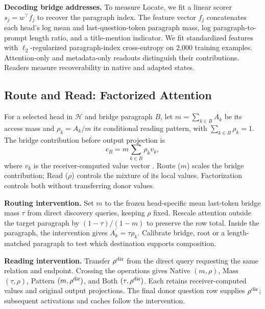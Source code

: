 \textbf{Decoding bridge addresses.} To measure Locate, we fit a linear scorer $s_j=w^\top f_j$ to recover the paragraph index. The feature vector $f_j$ concatenates each head's log mean and last-question-token paragraph mass, log paragraph-to-prompt length ratio, and a title-mention indicator. We fit standardized features with $\ell_2$-regularized paragraph-index cross-entropy on 2,000 training examples. Attention-only and metadata-only readouts distinguish their contributions. Readers measure recoverability in native and adapted states.
\subsection{Route and Read: Factorized Attention}\label{sec:factorization}
For a selected head in $\mathcal{H}$ and bridge paragraph $B$, let $m=\sum_{k\in B}A_k$ be its access mass and $\rho_k=A_k/m$ its conditional reading pattern, with $\sum_{k\in B}\rho_k=1$. The bridge contribution before output projection is
\begin{equation}c_B=m\sum_{k\in B}\rho_k v_k,\label{eq:contribution}\end{equation}
where $v_k$ is the receiver-computed value vector \citep{vaswani2017attention}. Route ($m$) scales the bridge contribution; Read ($\rho$) controls the mixture of its local values. Factorization controls both without transferring donor values.

\textbf{Routing intervention.} Set $m$ to the frozen head-specific mean last-token bridge mass $\tau$ from direct discovery queries, keeping $\rho$ fixed. Rescale attention outside the target paragraph by $(1-\tau)/(1-m)$ to preserve the row total. Inside the paragraph, the intervention gives $A_k^{\prime}=\tau\rho_k$. Calibrate bridge, root or a length-matched paragraph to test which destination supports composition.




\label{sec:reading}\textbf{Reading intervention.} Transfer $\rho^{\rm dir}$ from the direct query requesting the same relation and endpoint. Crossing the operations gives Native $(m,\rho)$, Mass $(\tau,\rho)$, Pattern $(m,\rho^{\rm dir})$, and Both $(\tau,\rho^{\rm dir})$. Each retains receiver-computed values and original output projections. The final donor question row supplies $\rho^{\rm dir}$; subsequent activations and caches follow the intervention.

